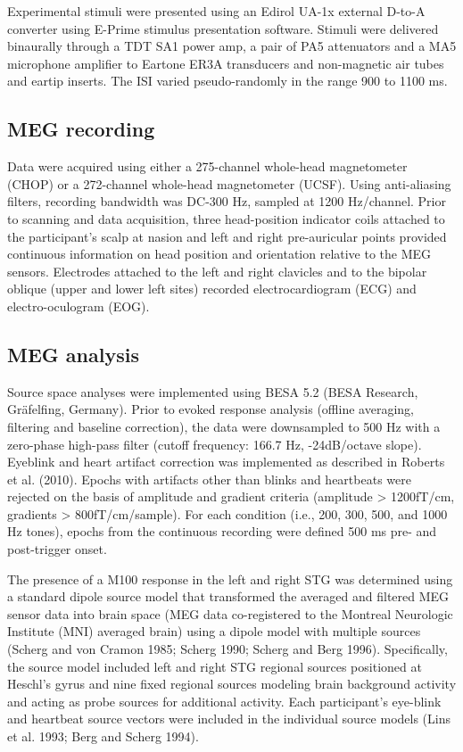 \documentclass{article}
\begin{document}
\medskip

Experimental stimuli were presented using an Edirol UA-1x external D-to-A converter using E-Prime stimulus presentation software.  Stimuli were delivered binaurally through a TDT SA1 power amp, a pair of PA5 attenuators and a MA5 microphone amplifier to Eartone ER3A transducers and non-magnetic air tubes and eartip inserts. The ISI varied pseudo-randomly in the range 900 to 1100 ms.  

\medskip

\subsection*{MEG recording}

Data were acquired using either a 275-channel whole-head magnetometer (CHOP) or a 272-channel whole-head magnetometer (UCSF). Using anti-aliasing filters, recording bandwidth was DC-300 Hz, sampled at 1200 Hz/channel. Prior to scanning and data acquisition, three head-position indicator coils attached to the participant’s scalp at nasion and left and right pre-auricular points provided continuous information on head position and orientation relative to the MEG sensors. Electrodes attached to the left and right clavicles and to the bipolar oblique (upper and lower left sites) recorded electrocardiogram (ECG) and electro-oculogram (EOG). 

\medskip

\subsection*{MEG analysis}

Source space analyses were implemented using BESA 5.2 (BESA Research, Gräfelfing, Germany). Prior to evoked response analysis (offline averaging, filtering and baseline correction), the data were downsampled to 500 Hz with a zero-phase high-pass filter (cutoff frequency: 166.7 Hz, -24dB/octave slope). Eyeblink and heart artifact correction was implemented as described in Roberts et al. (2010). Epochs with artifacts other than blinks and heartbeats were rejected on the basis of amplitude and gradient criteria (amplitude > 1200fT/cm, gradients > 800fT/cm/sample). For each condition (i.e., 200, 300, 500, and 1000 Hz tones), epochs from the continuous recording were defined 500 ms pre- and post-trigger onset.  

\medskip

The presence of a M100 response in the left and right STG was determined using a standard dipole source model that transformed the averaged and filtered MEG sensor data into brain space (MEG data co-registered to the Montreal Neurologic Institute (MNI) averaged brain) using a dipole model with multiple sources (Scherg and von Cramon 1985; Scherg 1990; Scherg and Berg 1996).  Specifically, the source model included left and right STG regional sources positioned at Heschl’s gyrus and nine fixed regional sources modeling brain background activity and acting as probe sources for additional activity.  Each participant’s eye-blink and heartbeat source vectors were included in the individual source models (Lins et al. 1993; Berg and Scherg 1994).  
\end{document}
